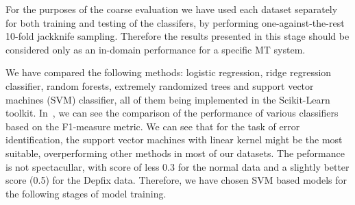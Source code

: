 For the purposes of the coarse evaluation we have used each dataset separately for both training
and testing of the classifers, by performing one-against-the-rest 10-fold jackknife sampling.
Therefore the results presented in this stage should be considered only as an in-domain
performance for a specific MT system.

We have compared the following methods: logistic regression, ridge regression classifier,
random forests, extremely randomized trees and support vector machines (SVM) classifier, all
of them being implemented in the Scikit-Learn toolkit.
In~, we can see the comparison of the performance of various classifiers based
on the F1-measure metric. We can see that for the task of error identification, the support vector
machines with linear kernel might be the most suitable, overperforming other methods in most of our
datasets. The  peformance is not spectacullar, with score of less 0.3 for the normal data
and a slightly better score (\tilda{}0.5) for the Depfix data. Therefore, we have chosen SVM based
models for the following stages of model training.

